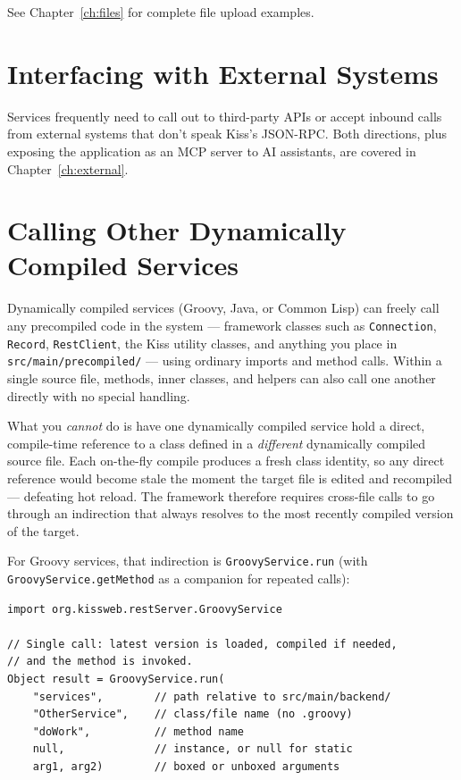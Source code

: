 \noindent
See Chapter~\ref{ch:files} for complete file upload examples.

\section{Interfacing with External Systems}
\label{sec:svc-external-pointer}

Services frequently need to call out to third-party APIs or accept inbound calls from external systems that don't speak Kiss's JSON-RPC.  Both directions, plus exposing the application as an MCP server to AI assistants, are covered in Chapter~\ref{ch:external}.

\section{Calling Other Dynamically Compiled Services}
\label{sec:svc-cross-call}

Dynamically compiled services (Groovy, Java, or Common Lisp) can freely call any precompiled code in the system --- framework classes such as \texttt{Connection}, \texttt{Record}, \texttt{RestClient}, the Kiss utility classes, and anything you place in \texttt{src/main/precompiled/} --- using ordinary imports and method calls.  Within a single source file, methods, inner classes, and helpers can also call one another directly with no special handling.

What you \emph{cannot} do is have one dynamically compiled service hold a direct, compile-time reference to a class defined in a \emph{different} dynamically compiled source file.  Each on-the-fly compile produces a fresh class identity, so any direct reference would become stale the moment the target file is edited and recompiled --- defeating hot reload.  The framework therefore requires cross-file calls to go through an indirection that always resolves to the most recently compiled version of the target.

For Groovy services, that indirection is \texttt{GroovyService.run} (with \texttt{GroovyService.getMethod} as a companion for repeated calls):

\begin{lstlisting}[style=groovy]
import org.kissweb.restServer.GroovyService

// Single call: latest version is loaded, compiled if needed,
// and the method is invoked.
Object result = GroovyService.run(
    "services",        // path relative to src/main/backend/
    "OtherService",    // class/file name (no .groovy)
    "doWork",          // method name
    null,              // instance, or null for static
    arg1, arg2)        // boxed or unboxed arguments
\end{lstlisting}

